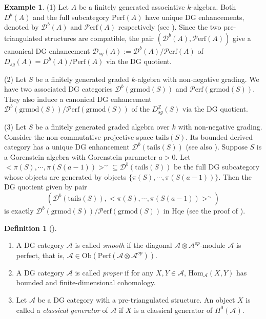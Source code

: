 \documentclass[11pt,reqno]{amsart}
\theoremstyle{definition}
\newtheorem{example}[theorem]{Example}
\newtheorem{definition}[theorem]{Definition}
\begin{document}
\begin{example}\label{jsvdic}
(1) Let $A$ be a finitely generated associative $k$-algebra. Both 
$D^{b}(A)$ and the full subcategory $\mathrm{Perf}(A)$ have unique 
DG enhancements, 
denoted by $\mathcal{D}^{b}(A)$ and $\mathcal{P}\mathrm{erf}(A)$ 
respectively (see \cite[Theorem A]{CNS}). Since the two pre-triangulated structures are compatible, 
the pair $(\mathcal{D}^{b}(A), \mathcal{P}\mathrm{erf}(A))$ give a canonical DG enhancement 
$\mathcal{D}_{sg}(A) := \mathcal{D}^{b}(A) / \mathcal{P}\mathrm{erf}(A)$ of 
$D_{sg}(A) = D^{b}(A)/\mathrm{Perf}(A)$ via the DG quotient. 

(2) Let $S$ be a finitely generated 
graded $k$-algebra 
with non-negative grading. 
We have two associated DG categories 
$\mathcal{D}^{b}(\mathrm{grmod}(S))$ and $\mathcal{P}\mathrm{erf}(\mathrm{grmod}(S))$. They also induce
a canonical DG enhancement 
$\mathcal{D}^{b}(\mathrm{grmod}(S)) / \mathcal{P}\mathrm{erf}(\mathrm{grmod}(S))$ of the 
$D^{\mathbb{Z}}_{sg}(S)$ via the DG quotient.

(3) Let $S$ be a finitely generated graded algebra over $k$ with 
non-negative grading. Consider the non-commutative projective space 
$\mathrm{tails}(S)$. Its bounded derived category has
a unique DG enhancement $\mathcal{D}^{b}(\mathrm{tails}(S)) $ 
(see also \cite[Theorem A]{CNS}). Suppose $S$ is a Gorenstein 
algebra with Gorenstein parameter $a > 0$.
Let $\big< \pi(S), \cdots, \pi(S(a-1)) \big>^{\sim} 
\subseteq \mathcal{D}^{b}(\mathrm{tails}(S))$ be the full DG subcategory whose 
objects are generated by 
objects $\{ \pi(S), \cdots, \pi(S(a-1)) \}$. Then the DG quotient given by pair 
$$
(\mathcal{D}^{b}(\mathrm{tails}(S)), \big< \pi(S), \cdots, \pi(S(a-1)) \big>^{\sim} )
$$ 
is exactly $\mathcal{D}^{b}(\mathrm{grmod}(S)) 
/ \mathcal{P}\mathrm{erf}(\mathrm{grmod}(S))$ in
$\mathrm{Hqe}$ (see the proof of \cite[Theorem 16]{DR2}). 	
\end{example}

\begin{definition}[{\cite[\S 3.7]{KL0}}] %
\begin{enumerate}
\item[(1)] A DG category $\mathcal{A}$ is called {\it smooth} 
if the diagonal $\mathcal{A} \otimes \mathcal{A}^{op}$-module $\mathcal A$ 
is perfect, that is,
$
\mathcal{A} \in \mathrm{Ob}( \mathrm{Perf}(\mathcal{A} \otimes \mathcal{A}^{op})).
$

\item[(2)] A DG category $\mathcal{A}$ is called {\it proper} if for any $X, Y \in \mathcal{A}$,
$
\mathrm{Hom}_{\mathcal{A}}(X, Y)
$ has bounded and finite-dimensional cohomology. 

\item[(3)] Let $\mathcal{A}$ be a DG category with a pre-triangulated structure. An 
object $X$ is called a {\it classical generator} 
of $\mathcal{A}$ if $X$ is a classical generator of $H^0(\mathcal{A})$. 
\end{enumerate}
\end{definition}
\end{document}

